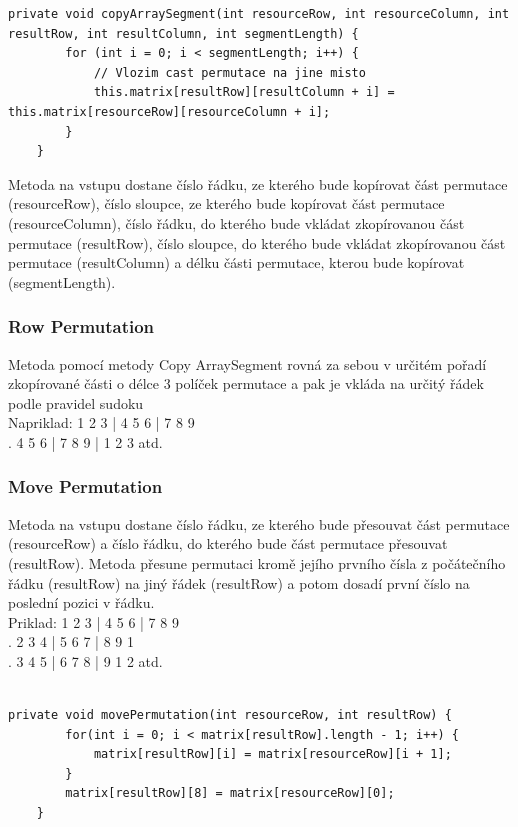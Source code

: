 \begin{small}
\begin{lstlisting}
private void copyArraySegment(int resourceRow, int resourceColumn, int resultRow, int resultColumn, int segmentLength) {
        for (int i = 0; i < segmentLength; i++) {
            // Vlozim cast permutace na jine misto
            this.matrix[resultRow][resultColumn + i] = this.matrix[resourceRow][resourceColumn + i];
        }
    }
\end{lstlisting}
\end{small}
Metoda na vstupu dostane číslo řádku, ze kterého bude kopírovat část permutace (resourceRow), číslo sloupce, ze kterého bude kopírovat část permutace (resourceColumn), číslo řádku, do kterého bude vkládat zkopírovanou část permutace (resultRow), číslo sloupce, do kterého bude vkládat zkopírovanou část permutace (resultColumn) a délku části permutace, kterou bude kopírovat (segmentLength).

\subsubsection{Row Permutation}
Metoda pomocí metody Copy ArraySegment rovná za sebou v určitém pořadí zkopírované části o délce 3 políček permutace a pak je vkláda na určitý řádek podle pravidel sudoku\\
Napriklad: 1 2 3 | 4 5 6 | 7 8 9\\
. \hspace{1.6cm} 4 5 6 | 7 8 9 | 1 2 3 atd.

\subsubsection{Move Permutation}
Metoda na vstupu dostane číslo řádku, ze kterého bude přesouvat část permutace (resourceRow) a číslo řádku, do kterého bude část permutace přesouvat (resultRow). Metoda přesune permutaci kromě jejího prvního čísla z počátečního řádku (resultRow) na jiný řádek (resultRow) a potom dosadí první číslo na poslední pozici v řádku.\\
Priklad:  1 2 3 | 4 5 6 | 7 8 9\\
. \hspace{1.15cm}          2 3 4 | 5 6 7 | 8 9 1\\
. \hspace{1.15cm}          3 4 5 | 6 7 8 | 9 1 2 atd.\\
\\
\begin{small}
\begin{lstlisting}
private void movePermutation(int resourceRow, int resultRow) {
        for(int i = 0; i < matrix[resultRow].length - 1; i++) {
            matrix[resultRow][i] = matrix[resourceRow][i + 1];
        }
        matrix[resultRow][8] = matrix[resourceRow][0];
    }
\end{lstlisting}
\end{small}

